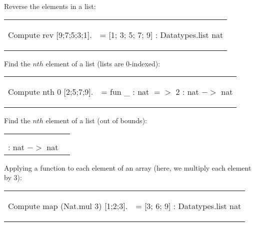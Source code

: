 \noindent
Reverse the elements in a list: 

\hspace{-1cm}
\begin{tabular}{p{8cm} p{8cm}}
\begin{code}	Compute rev [9;7;5;3;1].			\end{code}
&
\begin{msg}	= [1; 3; 5; 7; 9]     : Datatypes.list nat	\end{msg}
\end{tabular}

\noindent
Find the $nth$ element of a list (lists are 0-indexed): 

\hspace{-1cm}
\begin{tabular}{p{8cm} p{8cm}}
\begin{code}	Compute nth 0 [2;5;7;9].			\end{code}	
&
\begin{msg}	= fun \_ : nat $=>$ 2     : nat $->$ nat	\end{msg}
\end{tabular}

\noindent
Find the $nth$ element of a list (out of bounds): 

\hspace{-1cm}
\begin{tabular}{p{8cm} p{8cm}}
\begin{code}	Compute nth 4 [2;5;7;9].			
			\\ \cmt{Not found} 				\end{code}
&
\begin{msg}	= fun default : nat $=>$       default
		\\     : nat $->$ nat					\end{msg}
\end{tabular}

\noindent
Applying a function to each element of an array (here, we multiply each element by 3):

\hspace{-1cm}
\begin{tabular}{p{8cm} p{8cm}}
\begin{code}	Compute map (Nat.mul 3) [1;2;3].	\end{code}
&
\begin{msg}	= [3; 6; 9]     : Datatypes.list nat		\end{msg}
\end{tabular}



